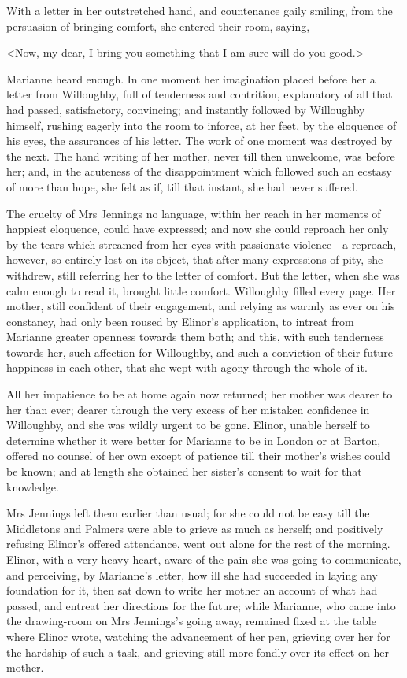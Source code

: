 With a letter in her outstretched hand, and countenance gaily smiling, from the persuasion of bringing comfort, she entered their room, saying,

<Now, my dear, I bring you something that I am sure will do you good.>

Marianne heard enough. In one moment her imagination placed before her a letter from Willoughby, full of tenderness and contrition, explanatory of all that had passed, satisfactory, convincing; and instantly followed by Willoughby himself, rushing eagerly into the room to inforce, at her feet, by the eloquence of his eyes, the assurances of his letter. The work of one moment was destroyed by the next. The hand writing of her mother, never till then unwelcome, was before her; and, in the acuteness of the disappointment which followed such an ecstasy of more than hope, she felt as if, till that instant, she had never suffered.

The cruelty of Mrs Jennings no language, within her reach in her moments of happiest eloquence, could have expressed; and now she could reproach her only by the tears which streamed from her eyes with passionate violence—a reproach, however, so entirely lost on its object, that after many expressions of pity, she withdrew, still referring her to the letter of comfort. But the letter, when she was calm enough to read it, brought little comfort. Willoughby filled every page. Her mother, still confident of their engagement, and relying as warmly as ever on his constancy, had only been roused by Elinor's application, to intreat from Marianne greater openness towards them both; and this, with such tenderness towards her, such affection for Willoughby, and such a conviction of their future happiness in each other, that she wept with agony through the whole of it.

All her impatience to be at home again now returned; her mother was dearer to her than ever; dearer through the very excess of her mistaken confidence in Willoughby, and she was wildly urgent to be gone. Elinor, unable herself to determine whether it were better for Marianne to be in London or at Barton, offered no counsel of her own except of patience till their mother's wishes could be known; and at length she obtained her sister's consent to wait for that knowledge.

Mrs Jennings left them earlier than usual; for she could not be easy till the Middletons and Palmers were able to grieve as much as herself; and positively refusing Elinor's offered attendance, went out alone for the rest of the morning. Elinor, with a very heavy heart, aware of the pain she was going to communicate, and perceiving, by Marianne's letter, how ill she had succeeded in laying any foundation for it, then sat down to write her mother an account of what had passed, and entreat her directions for the future; while Marianne, who came into the drawing-room on Mrs Jennings's going away, remained fixed at the table where Elinor wrote, watching the advancement of her pen, grieving over her for the hardship of such a task, and grieving still more fondly over its effect on her mother.

